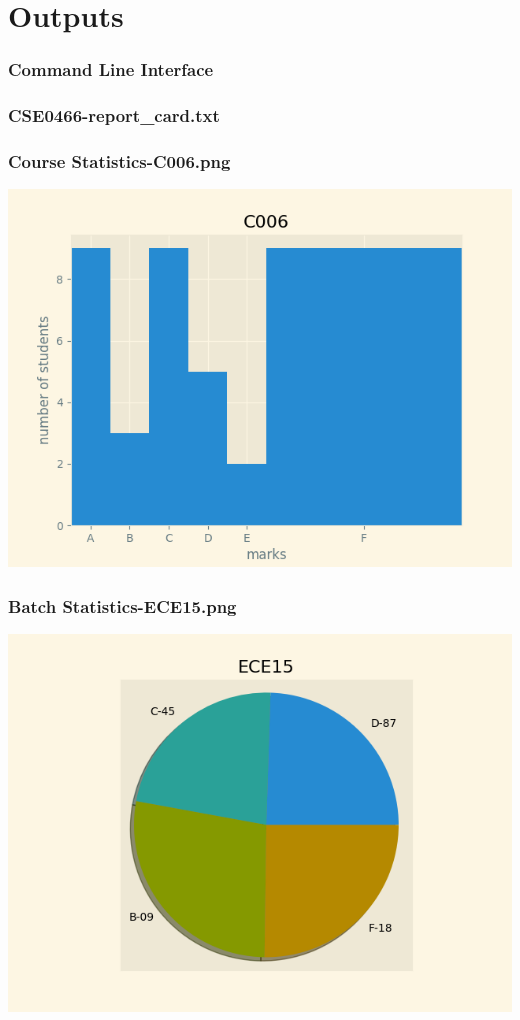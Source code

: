 \documentclass{article}
\begin{document}
\section{Outputs}
	\begin{center}
		\subsubsection*{Command Line Interface}
		\subsubsection*{CSE0466-report\_card.txt}
		\fontsize{10pt}{\baselineskip}\selectfont
		\fontsize{14pt}{\baselineskip}\selectfont
		\subsubsection*{Course Statistics-C006.png}
		\includegraphics{outputs/Course Statistics-C006.png}
		\subsubsection*{Batch Statistics-ECE15.png}
		\includegraphics{outputs/Batch Statistics-ECE15.png}

\end{center}
\end{document}
